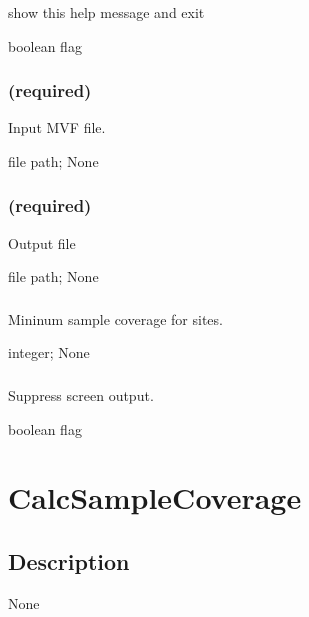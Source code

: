 \documentclass[letterpaper,11pt,english]{sphinxmanual}
\begin{document}
\subsubsection{}
\label{\detokenize{prog_desc:id63}}
 show this help message and exit

 boolean flag


\subsubsection{ (required)}
\label{\detokenize{prog_desc:id64}}
 Input MVF file.

 file path;  None


\subsubsection{ (required)}
\label{\detokenize{prog_desc:id65}}
 Output file

 file path;  None


\subsubsection{}
\label{\detokenize{prog_desc:id66}}
 Mininum sample coverage for sites.

 integer;  None


\subsubsection{}
\label{\detokenize{prog_desc:id67}}
 Suppress screen output.

 boolean flag


\section{CalcSampleCoverage}
\label{\detokenize{prog_desc:calcsamplecoverage}}

\subsection{Description}
\label{\detokenize{prog_desc:id68}}
None
\end{document}
